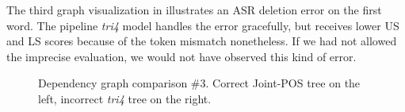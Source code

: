 \documentclass[11pt,letterpaper]{article}
\begin{document}
The third graph visualization in  illustrates an ASR deletion error on the first word. The pipeline \emph{tri4} model handles the error gracefully, but receives lower US and LS scores because of the token mismatch nonetheless. If we had not allowed the imprecise evaluation, we would not have observed this kind of error.
\begin{figure}[h]
    \centering
    \caption{Dependency graph comparison \#3. Correct Joint-POS tree on the left, incorrect \emph{tri4} tree on the right.}%
    \label{fpx3}%
\end{figure}
\end{document}
